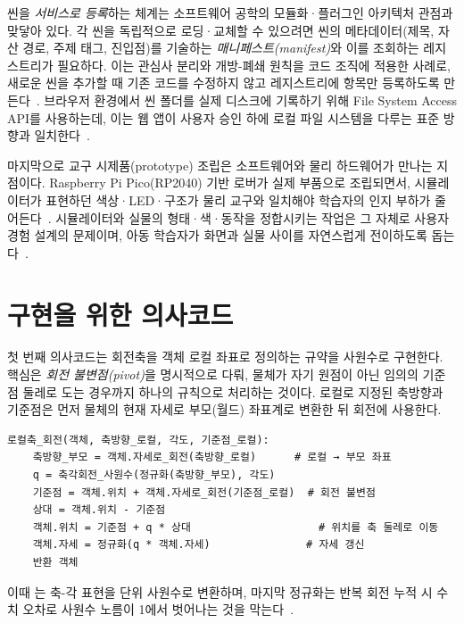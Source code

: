 씬을 \emph{서비스로 등록}하는 체계는 소프트웨어 공학의 모듈화·플러그인 아키텍처 관점과 맞닿아 있다. 각 씬을 독립적으로 로딩·교체할 수 있으려면 씬의 메타데이터(제목, 자산 경로, 주제 태그, 진입점)를 기술하는 \emph{매니페스트(manifest)}와 이를 조회하는 레지스트리가 필요하다. 이는 관심사 분리와 개방-폐쇄 원칙을 코드 조직에 적용한 사례로, 새로운 씬을 추가할 때 기존 코드를 수정하지 않고 레지스트리에 항목만 등록하도록 만든다~\cite{martin2008cleancode,gof1994}. 브라우저 환경에서 씬 폴더를 실제 디스크에 기록하기 위해 File System Access API를 사용하는데, 이는 웹 앱이 사용자 승인 하에 로컬 파일 시스템을 다루는 표준 방향과 일치한다~\cite{webbluetooth}.

마지막으로 교구 시제품(prototype) 조립은 소프트웨어와 물리 하드웨어가 만나는 지점이다. Raspberry Pi Pico(RP2040) 기반 로버가 실제 부품으로 조립되면서, 시뮬레이터가 표현하던 색상·LED·구조가 물리 교구와 일치해야 학습자의 인지 부하가 줄어든다~\cite{rp2040,norman2013design}. 시뮬레이터와 실물의 형태·색·동작을 정합시키는 작업은 그 자체로 사용자 경험 설계의 문제이며, 아동 학습자가 화면과 실물 사이를 자연스럽게 전이하도록 돕는다~\cite{papert1980,nielsen1993usability}.

\section{구현을 위한 의사코드}

첫 번째 의사코드는 회전축을 객체 로컬 좌표로 정의하는 규약을 사원수로 구현한다. 핵심은 \emph{회전 불변점(pivot)}을 명시적으로 다뤄, 물체가 자기 원점이 아닌 임의의 기준점 둘레로 도는 경우까지 하나의 규칙으로 처리하는 것이다. 로컬로 지정된 축방향과 기준점은 먼저 물체의 현재 자세로 부모(월드) 좌표계로 변환한 뒤 회전에 사용한다.

\begin{verbatim}
로컬축_회전(객체, 축방향_로컬, 각도, 기준점_로컬):
    축방향_부모 = 객체.자세로_회전(축방향_로컬)      # 로컬 → 부모 좌표
    q = 축각회전_사원수(정규화(축방향_부모), 각도)
    기준점 = 객체.위치 + 객체.자세로_회전(기준점_로컬)  # 회전 불변점
    상대 = 객체.위치 - 기준점
    객체.위치 = 기준점 + q * 상대                    # 위치를 축 둘레로 이동
    객체.자세 = 정규화(q * 객체.자세)               # 자세 갱신
    반환 객체
\end{verbatim}
이때 는 축-각 표현을 단위 사원수로 변환하며, 마지막 정규화는 반복 회전 누적 시 수치 오차로 사원수 노름이 1에서 벗어나는 것을 막는다~\cite{akenine2018realtime}.

